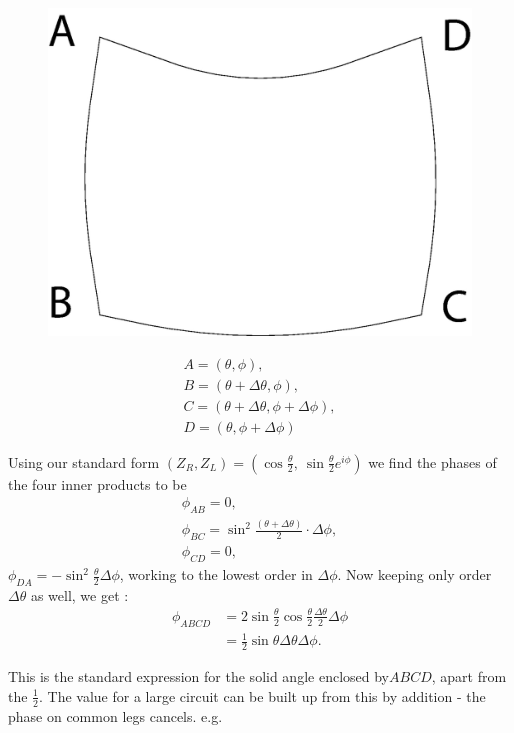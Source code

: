 \begin{figure}[H]
\centering
\includegraphics[scale=0.16]{src/images/chap26/12.jpg}
\end{figure}
\begin{gather*}
A = (\theta, \phi),\\
B = (\theta + \Delta \theta, \phi),\\
C = (\theta + \Delta \theta, \phi + \Delta \phi),\\
D = (\theta, \phi + \Delta \phi)
\end{gather*}

Using our standard form $(Z_R , Z_L ) = (\cos \frac{\theta}{2}, ~ \sin \frac{\theta}{2} e^{i\phi})$ we find the phases
of the four inner products to be
\begin{gather*}
\phi_{AB} = 0,\\
\phi_{BC} = \sin^2 \frac{(\theta + \Delta \theta)}{2} \cdot \Delta \phi,\\
\phi_{CD} = 0,
\end{gather*}
$\phi_{DA} = -\sin^2 \frac{\theta}{2} \Delta \phi$, working to the lowest order in $\Delta \phi$. 
Now keeping only order $\Delta \theta$ as well, we get :
\begin{align*}
\phi_{ABCD} &= 2 \sin \frac{\theta}{2} \cos \frac{\theta}{2} \frac{\Delta \theta }{2} \Delta \phi\\
&= \frac{1}{2} \sin \theta \Delta \theta \Delta \phi.
\end{align*}

This is the standard expression for the solid angle enclosed by\break $ABCD$, apart
from the $\frac{1}{2}$. The value for a large circuit can be built up from this by addition -
the phase on common legs cancels. e.g.
\bigskip


